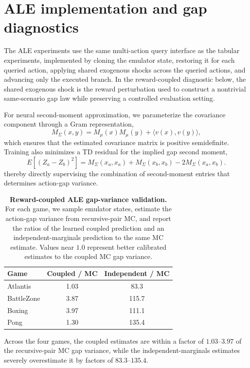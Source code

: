 \documentclass[accepted]{uai2026}
\theoremstyle{plain}
\theoremstyle{definition}
\theoremstyle{remark}
\newcommand{\1}{\mathbbm{1}}
\begin{document}
\newpage
\section{ALE implementation and gap diagnostics}\label{app:ale}

The ALE experiments use the same multi-action query interface as the tabular experiments, implemented by cloning the emulator state, restoring it for each queried action, applying shared exogenous shocks across the queried actions, and advancing only the executed branch. In the reward-coupled diagnostic below, the shared exogenous shock is the reward perturbation used to construct a nontrivial same-scenario gap law while preserving a controlled evaluation setting.

For neural second-moment approximation, we parameterize the covariance component through a Gram representation,
\begin{equation}
M_\Sigma(x,y) = M_\mu(x)M_\mu(y) + \langle v(x),v(y)\rangle,
\end{equation}
which ensures that the estimated covariance matrix is positive semidefinite. Training also minimizes a TD residual for the implied gap second moment,
\begin{equation}
E[(Z_a - Z_b)^2] = M_\Sigma(x_a,x_a) + M_\Sigma(x_b,x_b) - 2M_\Sigma(x_a,x_b).
\end{equation}
thereby directly supervising the combination of second-moment entries that determines action-gap variance.

\begin{table}[h]
\centering
\caption{\textbf{Reward-coupled ALE gap-variance validation.}
For each game, we sample emulator states, estimate the action-gap variance from recursive-pair MC, and report the ratios of the learned coupled prediction and an independent-marginals prediction to the same MC estimate. Values near $1.0$ represent better calibrated estimates to the coupled MC gap variance.}
\label{tab:ale-gap-ratios}
\begin{tabular}{lcc}
\toprule
Game & Coupled / MC & Independent / MC \\
\midrule
Atlantis & 1.03 & 83.3 \\
BattleZone & 3.87 & 115.7 \\
Boxing & 3.97 & 111.1 \\
Pong & 1.30 & 135.4 \\
\bottomrule
\end{tabular}
\end{table}

Across the four games, the coupled estimates are within a factor of $1.03$--$3.97$ of the recursive-pair MC gap variance, while the independent-marginals estimates severely overestimate it by factors of $83.3$--$135.4$.
\end{document}
